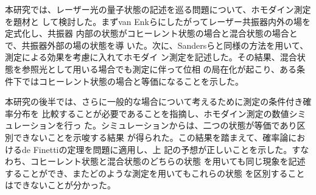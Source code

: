\documentclass[11pt]{jsarticle}
\begin{document}
本研究では、レーザー光の量子状態の記述を巡る問題について、ホモダイン測定を題材と
して検討した。まずvan Enkらにしたがってレーザー共振器内外の場を定式化し、共振器
内部の状態がコヒーレント状態の場合と混合状態の場合とで、共振器外部の場の状態を導
いた。次に、Sandersらと同様の方法を用いて、測定による効果を考慮に入れてホモダイ
ン測定を記述した。その結果、混合状態を参照光として用いる場合でも測定に伴って位相
の局在化が起こり、ある条件下ではコヒーレント状態の場合と等価になることを示した。

本研究の後半では、さらに一般的な場合について考えるために測定の条件付き確率分布を
比較することが必要であることを指摘し、ホモダイン測定の数値シミュレーションを行っ
た。シミュレーションからは、二つの状態が等価であり区別できないことを示唆する結果
が得られた。この結果を踏まえて、確率論におけるde Finettiの定理を問題に適用し、上
記の予想が正しいことを示した。すなわち、コヒーレント状態と混合状態のどちらの状態
を用いても同じ現象を記述することができ、またどのような測定を用いてもこれらの状態
を区別することはできないことが分かった。
\end{document}
